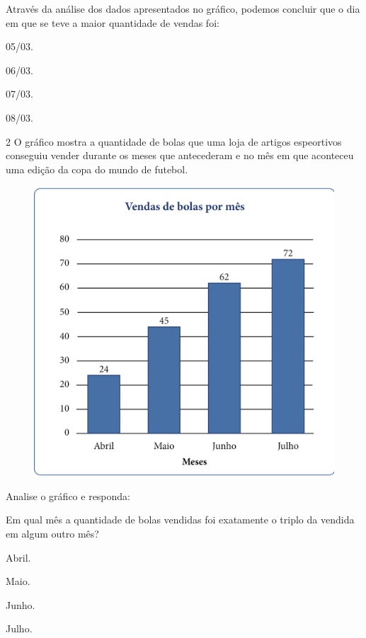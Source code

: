 Através da análise dos dados apresentados no gráfico, podemos concluir
que o dia em que se teve a maior quantidade de vendas foi:

\begin{minipage}{.5\textwidth}
\begin{escolha}
\item
  05/03.
\item
  06/03.
\item
  07/03.
\item
  08/03.
\end{escolha}
\end{minipage}


\pagebreak
\num{2} O gráfico mostra a quantidade de bolas que uma loja de
artigos espeortivos conseguiu vender durante os meses que antecederam e no mês em que aconteceu uma edição da copa do mundo de futebol.

\begin{figure}[htpb!]
\centering
\includegraphics[width=\textwidth]{../ilustracoes/MAT5/SAEB_5ANO_MAT_figura65.png}
\end{figure}

Analise o gráfico e responda:

Em qual mês a quantidade de bolas vendidas foi exatamente o triplo da vendida em algum outro mês?

\begin{minipage}{.5\textwidth}
\begin{escolha}
\item
  Abril.
\item
  Maio.
\item
  Junho.
\item
  Julho.
\end{escolha}
\end{minipage}


